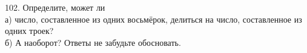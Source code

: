 102. Определите, может ли\\
а) число, составленное из одних восьмёрок, делиться на число, составленное из одних троек?\\
б) А наоборот? Ответы не забудьте обосновать.\\
